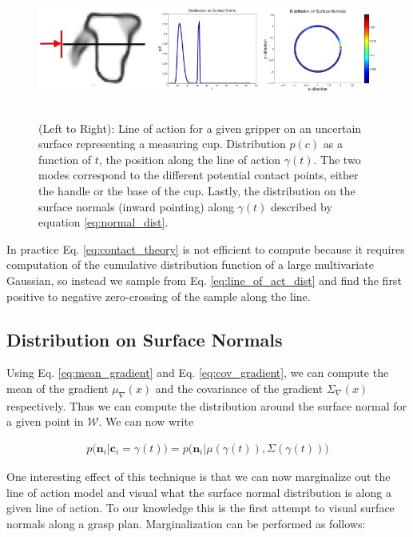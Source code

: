 \documentclass[letterpaper, 10 pt, conference]{ieeeconf}  %
\begin{document}
\begin{figure}[ht!]
\centering
\includegraphics[width = 17cm, height = 4.5cm]{figures/Slide04.jpg}
\caption{ \footnotesize (Left to Right): Line of action for a given gripper on an uncertain surface representing a measuring cup. Distribution $p(c)$ as a function of $t$, the position along the line of action $\gamma(t)$. The two modes correspond to the different potential contact points, either the handle or the base of the cup. Lastly, the distribution on the surface normals (inward pointing) along $\gamma(t)$ described by equation \ref{eq:normal_dist}. }
\vspace*{-10pt}
\label{fig:GraspDist}
\end{figure}

In practice Eq. \ref{eq:contact_theory} is not efficient to compute because it requires computation of the cumulative distribution function of a large multivariate Gaussian, so instead we sample from Eq. \ref{eq:line_of_act_dist} and find the first positive to negative zero-crossing of the sample along the line. 


\subsection{Distribution on Surface Normals}\label{sec:normals} 
Using Eq. \ref{eq:mean_gradient} and Eq. \ref{eq:cov_gradient}, we can compute the mean of the gradient $ \mu_{\nabla}(x)$ and the covariance of the gradient $\Sigma_{\nabla}(x)$ respectively. Thus we can compute the distribution around the surface normal for a given point in $\mathcal{W}$. We can now write 

\vspace{-2ex}
\begin{align*}
p\big(\textbf{n}_i|\textbf{c}_i = \gamma(t)\big) = p\big(\textbf{n}_i |\mu(\gamma(t)), \Sigma(\gamma(t)) \big)
\end{align*}

One interesting effect of this technique is that we can now marginalize out the line of action model and visual what the surface normal distribution is along a given line of action. To our knowledge this is the first attempt to visual surface normals along a grasp plan. Marginalization can be performed as follows:
\end{document}
